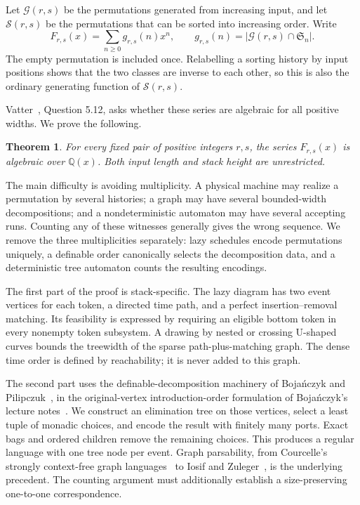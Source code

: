 \documentclass[11pt]{article}
\newtheorem{theorem}{Theorem}[section]
\theoremstyle{definition}\newtheorem{definition}[theorem]{Definition}
\theoremstyle{remark}\newtheorem{remark}[theorem]{Remark}
\newcommand{\Q}{\mathbb Q}
\newcommand{\G}{\mathcal G}
\newcommand{\Sclass}{\mathcal S}
\begin{document}
Let $\G(r,s)$ be the permutations generated from increasing input, and let $\Sclass(r,s)$ be the permutations that can be sorted into increasing order. Write
\[
 F_{r,s}(x)=\sum_{n\ge0}g_{r,s}(n)x^n,
 \qquad g_{r,s}(n)=|\G(r,s)\cap\mathfrak S_n|.
\]
The empty permutation is included once. Relabelling a sorting history by input positions shows that the two classes are inverse to each other, so this is also the ordinary generating function of $\Sclass(r,s)$.

Vatter~\cite{Vatter2026}, Question 5.12, asks whether these series are algebraic for all positive widths. We prove the following.

\begin{theorem}\label{thm:main}
For every fixed pair of positive integers $r,s$, the series $F_{r,s}(x)$ is algebraic over $\Q(x)$. Both input length and stack height are unrestricted.
\end{theorem}

The main difficulty is avoiding multiplicity. A physical machine may realize a permutation by several histories; a graph may have several bounded-width decompositions; and a nondeterministic automaton may have several accepting runs. Counting any of these witnesses generally gives the wrong sequence. We remove the three multiplicities separately: lazy schedules encode permutations uniquely, a definable order canonically selects the decomposition data, and a deterministic tree automaton counts the resulting encodings.

The first part of the proof is stack-specific. The lazy diagram has two event vertices for each token, a directed time path, and a perfect insertion--removal matching. Its feasibility is expressed by requiring an eligible bottom token in every nonempty token subsystem. A drawing by nested or crossing U-shaped curves bounds the treewidth of the sparse path-plus-matching graph. The dense time order is defined by reachability; it is never added to this graph.

The second part uses the definable-decomposition machinery of Boja\'nczyk and Pilipczuk~\cite{BP2016,BP2022}, in the original-vertex introduction-order formulation of Boja\'nczyk's lecture notes~\cite[Definitions 6.20--6.21 and Theorem 6.22]{Bojanczyk2020}. We construct an elimination tree on those vertices, select a least tuple of monadic choices, and encode the result with finitely many ports. Exact bags and ordered children remove the remaining choices. This produces a regular language with one tree node per event. Graph parsability, from Courcelle's strongly context-free graph languages~\cite{Courcelle1991} to Iosif and Zuleger~\cite{IosifZuleger2026}, is the underlying precedent. The counting argument must additionally establish a size-preserving one-to-one correspondence.
\end{document}
